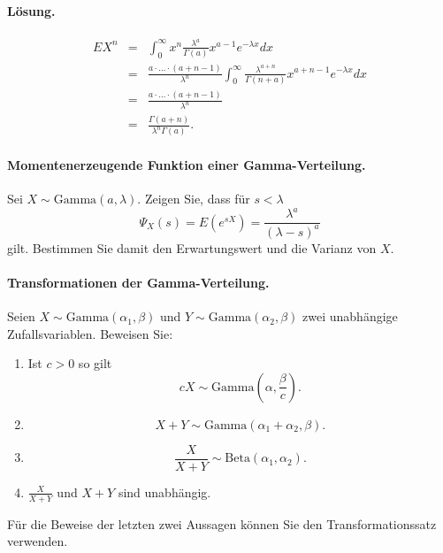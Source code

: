 \paragraph*{Lösung.}
\begin{eqnarray*}
    E X^n &=& \int_{0}^{\infty} x^n \frac{\lambda^a}{\Gamma(a)}x^{a-1}e^{-\lambda x} dx \\
    &=& \frac{a \cdot\ldots\cdot \left( a+n-1 \right)}{\lambda^n} 
    \int_{0}^{\infty} \frac{\lambda^{a+n}}{\Gamma(n+a)} x^{a+n-1} e^{-\lambda x} dx \\
    &=& \frac{a\cdot \ldots \cdot \left( a+n-1 \right)}{\lambda^n} \\
    &=& \frac{\Gamma\left( a+n \right)}{ \lambda^n \Gamma\left( a \right)}.
\end{eqnarray*}


\paragraph{Momentenerzeugende Funktion einer Gamma-Verteilung. }
Sei $X \sim \textrm{Gamma}(a, \lambda)$. Zeigen Sie, dass für $s<\lambda$
\begin{equation*}
    \Psi_X(s) = E \left( e^{sX} \right) = \frac{\lambda^a}{ (\lambda-s)^a}
\end{equation*}
gilt. Bestimmen Sie damit den Erwartungswert und die Varianz von $X$. %

\paragraph{Transformationen der Gamma-Verteilung. } Seien $X \sim
\textrm{Gamma}(\alpha_1, \beta)$ und $Y \sim \textrm{Gamma}(\alpha_2, \beta)$
zwei unabhängige Zufallsvariablen. Beweisen Sie:
\begin{enumerate}
    \item Ist $c>0$ so gilt
        \begin{equation*}
            c X \sim \text{Gamma}(\alpha, \frac{\beta}{c}).
        \end{equation*}
    \item \begin{equation*}
            X + Y \sim \text{Gamma}(\alpha_1 + \alpha_2, \beta).
        \end{equation*}
    \item \begin{equation*}
            \frac{X}{X+Y} \sim \text{Beta}(\alpha_1, \alpha_2).
        \end{equation*}
    \item $\frac{X}{X+Y}$ und $X+Y$ sind unabhängig. 
\end{enumerate}
Für die Beweise der letzten zwei Aussagen können Sie den Transformationssatz
verwenden. 

